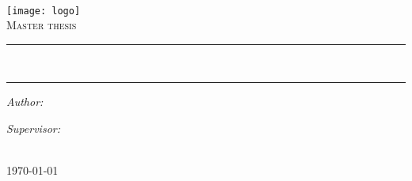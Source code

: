 \documentclass[
10pt,
english,
singlespacing,
headsepline,
]{MastersDoctoralThesis}
\author{Philipp \textsc{Denzel}} %
\begin{document}
\frontmatter %

\pagestyle{plain} %


\begin{titlepage}
\begin{center}

\textsc{\LARGE \univname}\\[1.0cm] %

\texttt{[image: logo]}\\[1.0cm] %

\textsc{\Large Master thesis}\\[1.0cm] %

\hrule\vspace{0.4cm} %
\doublespacing {\huge \ttitle}\\[0.4cm] %
\hrule\vspace{1.5cm} %

\begin{minipage}{0.4\textwidth}
\begin{flushleft} \large
\emph{Author:}\\
{\authorname} %
\end{flushleft}
\end{minipage}
\begin{minipage}{0.4\textwidth}
\begin{flushright} \large
\emph{Supervisor:} \\
{\supname} %
\end{flushright}
\end{minipage}\\[3cm]

{\large \today}\\[4cm] %

\vfill
\end{center}
\newpage
\thispagestyle{empty}
\mbox{}
\end{titlepage}
\end{document}

